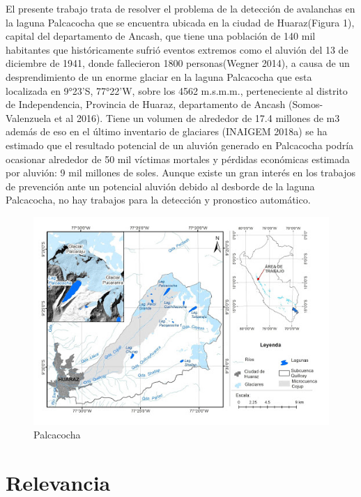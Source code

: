 \documentclass[a4paper,11pt]{report}
\begin{document}
El presente trabajo trata de resolver el problema de la detección de avalanchas en la laguna Palcacocha que se encuentra ubicada en la ciudad de Huaraz(Figura 1), capital del departamento de Ancash, que tiene una población de 140 mil habitantes  que históricamente sufrió eventos extremos como el aluvión del 13 de diciembre de 1941, donde fallecieron 1800 personas(Wegner 2014), a causa de un desprendimiento de un enorme glaciar en la laguna Palcacocha que esta localizada en 9°23’S, 77°22’W, sobre los 4562 m.s.m.m., perteneciente al distrito de Independencia, Provincia de Huaraz, departamento de Ancash (Somos-Valenzuela et al 2016). Tiene un volumen de alrededor de 17.4 millones de m3 además de eso en el último inventario de glaciares (INAIGEM 2018a) se ha estimado que el resultado potencial de un aluvión generado en Palcacocha podría ocasionar alrededor de 50 mil víctimas mortales y pérdidas económicas estimada por aluvión: 9 mil millones de soles.  Aunque existe un gran interés en los trabajos de prevención ante un potencial aluvión debido al desborde de la laguna Palcacocha, no hay trabajos para la detección y pronostico automático.



\begin{figure}[h]
	\centering
	\includegraphics[scale=0.8]{palcacocha}
	\caption{Palcacocha}
	\label{fig:Ubicacion de la laguna Palcacocha}
\end{figure}

\section{Relevancia}
\end{document}
